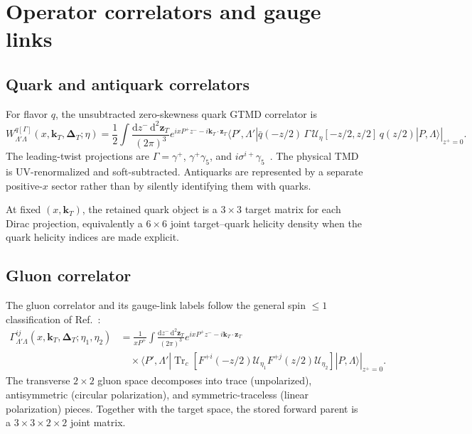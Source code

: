 \documentclass[11pt]{article}
\newcommand{\kT}{\bm{k}_{T}}
\newcommand{\DT}{\bm{\Delta}_{T}}
\newcommand{\Tr}{\operatorname{Tr}}
\newcommand{\dd}{\mathrm{d}}
\begin{document}
\section{Operator correlators and gauge links}
\label{sec:operators}

\subsection{Quark and antiquark correlators}

For flavor \(q\), the unsubtracted zero-skewness quark GTMD correlator is
\begin{equation}
W_{\Lambda'\Lambda}^{q[\Gamma]}(x,\kT,\DT;\eta)
=\frac12\int\frac{\dd z^-\,\dd^2\bm z_T}{(2\pi)^3}
e^{ixP^+z^- -i\kT\cdot\bm z_T}
\left.
\langle P',\Lambda'|
\bar q(-z/2)\,\Gamma\,\mathcal U_\eta[-z/2,z/2]\,
q(z/2)
|P,\Lambda\rangle
\right|_{z^+=0}.
\label{eq:quark-gtmd}
\end{equation}
The leading-twist projections are
\(\Gamma=\gamma^+\), \(\gamma^+\gamma_5\), and
\(i\sigma^{i+}\gamma_5\)~\cite{BacchettaMulders2000,KumanoSong2021}.
The physical TMD is UV-renormalized and
soft-subtracted.  Antiquarks are represented by a separate positive-\(x\)
sector rather than by silently identifying them with quarks.

At fixed \((x,\kT)\), the retained quark object is a \(3\times3\) target
matrix for each Dirac projection, equivalently a \(6\times6\) joint
target--quark helicity density when the quark helicity indices are made
explicit.

\subsection{Gluon correlator}

The gluon correlator and its gauge-link labels follow the general spin
\(\leq1\) classification of Ref.~\cite{Boer2016}:
\begin{align}
\Gamma_{\Lambda'\Lambda}^{ij}(x,\kT,\DT;\eta_1,\eta_2)
&=\frac{1}{xP^+}\int\frac{\dd z^-\,\dd^2\bm z_T}{(2\pi)^3}
e^{ixP^+z^- -i\kT\cdot\bm z_T}
\nonumber\\[-1mm]
&\quad\times
\left.
\langle P',\Lambda'|
\Tr_c\!\left[
F^{+i}(-z/2)\mathcal U_{\eta_1}
F^{+j}(z/2)\mathcal U_{\eta_2}
\right]|P,\Lambda\rangle
\right|_{z^+=0}.
\label{eq:gluon-gtmd}
\end{align}
The transverse \(2\times2\) gluon space decomposes into trace
(unpolarized), antisymmetric (circular polarization), and
symmetric-traceless (linear polarization) pieces.  Together with the
target space, the stored forward parent is a
\(3\times3\times2\times2\) joint matrix.
\end{document}
